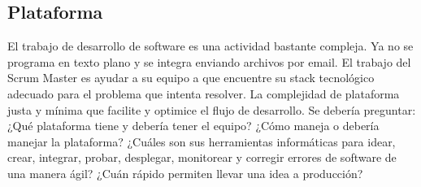 \subsection{Plataforma}


El trabajo de desarrollo de software es una actividad bastante compleja. Ya no se programa en texto plano y se integra enviando archivos por email. El trabajo del Scrum Master es ayudar a su equipo a que encuentre su stack tecnológico adecuado para el problema que intenta resolver. La complejidad de plataforma justa y mínima que facilite y optimice el flujo de desarrollo. Se debería preguntar: ¿Qué plataforma tiene y debería tener el equipo? ¿Cómo maneja o debería manejar la plataforma? ¿Cuáles son sus herramientas informáticas para idear, crear, integrar, probar, desplegar, monitorear y corregir errores de software de una manera ágil? ¿Cuán rápido permiten llevar una idea a producción?


